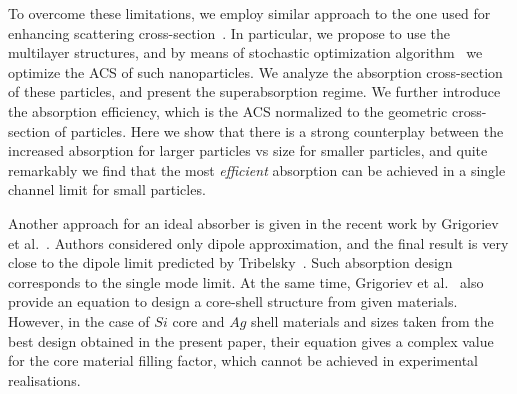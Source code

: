 \documentclass[aps,prl,twocolumn,showpacs,superscriptaddress,groupedaddress]{revtex4-1}  %
\begin{document}
To overcome these limitations, we employ similar approach to the one
used for enhancing scattering cross-section~\cite{Fan-2011}. In
particular, we propose to use the multilayer structures, and by means
of stochastic optimization algorithm~\cite{Jingqiao-JADE-2009} we
optimize the ACS of such nanoparticles. We analyze the absorption
cross-section of these particles, and present the superabsorption
regime. We further introduce the absorption efficiency, which is the
ACS normalized to the geometric cross-section of particles. Here we
show that there is a strong counterplay between the increased
absorption for larger particles vs size for smaller particles, and
quite remarkably we find that the most {\em efficient} absorption can
be achieved in a single channel limit for small particles.

Another approach for an ideal absorber is given in the recent work by
Grigoriev et al.~\cite{Grigoriev-2015}. Authors considered only dipole
approximation, and the final result is very close to the dipole limit
predicted by Tribelsky~\cite{Tribelsky-2011}.  Such absorption design
corresponds to the single mode limit.  At the same time, Grigoriev et
al.~\cite{Grigoriev-2015} also provide an equation to design a
core-shell structure from given materials. However, in the case of
$Si$ core and $Ag$ shell materials and sizes taken from the best
design obtained in the present paper, their equation gives a complex
value for the core material filling factor, which cannot be achieved
in experimental realisations.

\begin{figure}
\end{figure}
\end{document}
